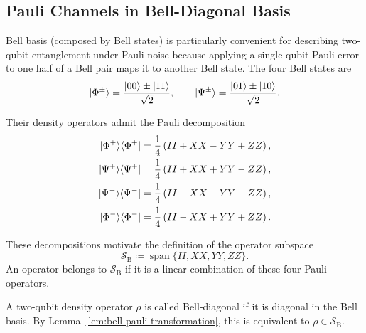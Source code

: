 \subsection{Pauli Channels in Bell-Diagonal Basis}

Bell basis (composed by Bell states) is particularly convenient for describing two-qubit
entanglement under Pauli noise because applying a single-qubit Pauli error to one half of a Bell pair maps it to another Bell state.
The four Bell states are
\begin{equation}
    \ket{\Phi^\pm}
    =
    \frac{\ket{00}\pm\ket{11}}{\sqrt{2}},
    \qquad
    \ket{\Psi^\pm}
    =
    \frac{\ket{01}\pm\ket{10}}{\sqrt{2}}.
\end{equation}

Their density operators admit the Pauli decomposition
\begin{equation}
    \begin{aligned}
        \ket{\Phi^+}\!\bra{\Phi^+}
         & =
        \frac{1}{4}
        \left(
        I I
        +X X
        -Y Y
        +Z Z
        \right), \\
        \ket{\Psi^+}\!\bra{\Psi^+}
         & =
        \frac{1}{4}
        \left(
        I I
        +X X
        +Y Y
        -Z Z
        \right), \\
        \ket{\Psi^-}\!\bra{\Psi^-}
         & =
        \frac{1}{4}
        \left(
        I I
        -X X
        -Y Y
        -Z Z
        \right), \\
        \ket{\Phi^-}\!\bra{\Phi^-}
         & =
        \frac{1}{4}
        \left(
        I I
        -X X
        +Y Y
        +Z Z
        \right).
    \end{aligned}
    \label{eq:bell-projector-pauli-expansions}
\end{equation}

These decompositions motivate the definition of the operator subspace
\begin{equation}
    \mathcal S_{\mathrm B}
    \coloneqq
    \operatorname{span}
    \{I I, X X, Y Y, Z Z\}.
    \label{eq:bell-diagonal-subspace}
\end{equation}
An operator belongs to $\mathcal S_{\mathrm B}$ if it is a linear
combination of these four Pauli operators.

A two-qubit density operator $\rho$ is called Bell-diagonal if it
is diagonal in the Bell basis. By
Lemma~\ref{lem:bell-pauli-transformation}, this is equivalent to
$\rho\in\mathcal S_{\mathrm B}$.

